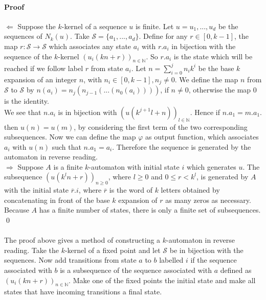 \documentclass{article}
\begin{document}
\paragraph{Proof}
$\Leftarrow$ Suppose the $k$-kernel of a sequence $u$ is finite. Let
$u = u_1, ..., u_d$ be the sequences of $N_k(u)$. Take
$\mathcal{S} = \{a_1, ..., a_d\}$.
Define for any $r \in [0, k - 1]$, the map
$r : \mathcal{S} \rightarrow \mathcal{S}$ which associates any state $a_i$ with
$r.a_i$ in bijection with the sequence of the $k$-kernel
$(u_i(kn + r))_{n \in \mathbb{N}}$. So $r.a_i$ is the state which will be
reached if we follow label $r$ from state $a_i$. Let
$n = \sum_{i = 0}^j n_i k^i$ be the base $k$ expansion of an integer $n$, with
$n_i \in [0, k - 1], n_j \ne 0$.  We define the map $n$ from
$\mathcal{S}$ to $\mathcal{S}$ by $n(a_i) = n_j(n_{j - 1}( ... (n_0(a_i))))$,
if $n \ne 0$, otherwise the map 0 is the identity.\\
We see that $n.a_i$ is in bijection with
$(u(k^{j + 1} l + n))_{l \in \mathbb{N}}$. Hence if $n.a_1 = m.a_1$. then
$u(n) = u(m)$, by considering the first term of the two corresponding
subsequences. Now we can define the map $\varphi$ as output function, which
associates $a_i$ with $u(n)$ such that $n.a_1 = a_i$. Therefore the sequence
is generated by the automaton in reverse reading.\\
$\Rightarrow$ Suppose $A$ is a finite $k$-automaton with initial state $i$
which generates $u$. The subsequence $(u(k^ln + r))_{n \ge 0}$, where
$l \ge 0$ and $0 \le r < k^l$, is generated by $A$ with the initial state
$\overline{r}.i$, where $\overline{r}$ is the word of $k$ letters obtained
by concatenating in front of the base $k$ expansion of $r$ as many zeros as
necessary. Because $A$ has a finite number of states, there is only a finite
set of subsequences. \qed\\
\\
The proof above gives a method of constructing a $k$-automaton in reverse
reading. Take the $k$-kernel of a fixed point and let $\mathcal{S}$ be in
bijection with the sequences. Now add transitions from state $a$ to $b$
labelled $i$ if the sequence associated with $b$ is a subsequence of the
sequence associated with $a$ defined as $(u_i(kn + r))_{n \in \mathbb{N}}$.
Make one of the fixed points the initial state and make all states that have
incoming transitions a final state.
\end{document}
